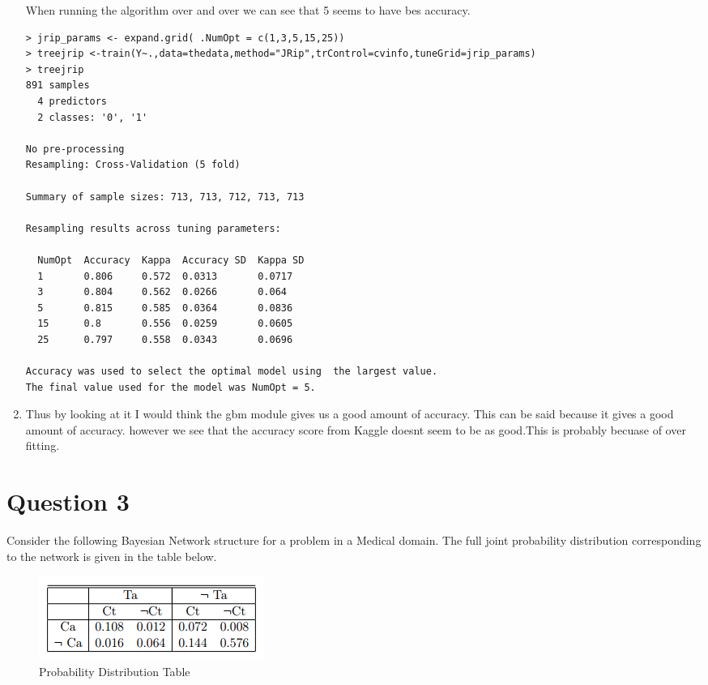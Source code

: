 \documentclass[fontsize=10pt]{scrartcl}
\begin{document}
\begin{enumerate}
			When running the algorithm over and over we can see that 5 seems to have bes accuracy.

\begin{verbatim}
> jrip_params <- expand.grid( .NumOpt = c(1,3,5,15,25))
> treejrip <-train(Y~.,data=thedata,method="JRip",trControl=cvinfo,tuneGrid=jrip_params)
> treejrip
891 samples
  4 predictors
  2 classes: '0', '1' 

No pre-processing
Resampling: Cross-Validation (5 fold) 

Summary of sample sizes: 713, 713, 712, 713, 713 

Resampling results across tuning parameters:

  NumOpt  Accuracy  Kappa  Accuracy SD  Kappa SD
  1       0.806     0.572  0.0313       0.0717  
  3       0.804     0.562  0.0266       0.064   
  5       0.815     0.585  0.0364       0.0836  
  15      0.8       0.556  0.0259       0.0605  
  25      0.797     0.558  0.0343       0.0696  

Accuracy was used to select the optimal model using  the largest value.
The final value used for the model was NumOpt = 5. 
\end{verbatim}
	

	\item
	Thus by looking at it I would think the gbm module gives us a good amount of accuracy. This can be said because it gives a good amount of accuracy. however we see that the accuracy score from Kaggle doesnt seem to be as good.This is probably becuase of over fitting.
		\end{enumerate}


	\section{Question 3}

	Consider the following Bayesian Network structure for a problem in a Medical domain. The full joint probability distribution corresponding to the network is given in the table below.
	\begin{figure}[H]
		\begin{center}
			\includegraphics[scale=1]{resources/img3a.png}
			\caption{Probability Distribution Table}
		\end{center}
	\end{figure}
\end{document}
